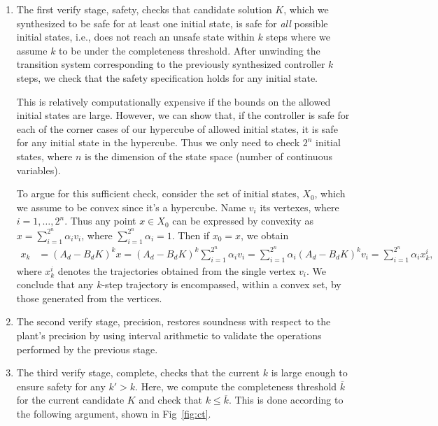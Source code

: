 \documentclass[runningheads,a4paper]{llncs}
\begin{document}
\begin{enumerate}
\item The first {\sc verify} stage, {\sc safety}, checks that candidate
solution $K$, which we synthesized to be safe for at least one initial state, is safe for \emph{all} possible initial states, i.e., does not reach an unsafe
state within $k$ steps where we assume $k$ to be under the completeness threshold. 
After unwinding the transition system corresponding to the previously synthesized controller
$k$ steps, we check that the safety specification holds for any initial state. 

This is relatively computationally expensive if the bounds on the
allowed initial states are large.  However, we can show that, if the
controller is safe for each of the corner cases of our hypercube of
allowed initial states, it is safe for any initial state in the
hypercube. Thus we only need to check $2^n$ initial states, where $n$
is the dimension of the state space (number of continuous variables). 

To argue for this sufficient check, 
consider the set of initial states, $X_0$, which we assume to be convex since it's a hypercube. 
Name $v_i$ its vertexes, where $i=1,\ldots, 2^n$.  
Thus any point $x \in X_0$ can be expressed by convexity as $x = \sum_{i=1}^{2^n} \alpha_i v_i$, 
where $\sum_{i=1}^{2^n} \alpha_i =1$. Then if $x_0=x$, we obtain 
\begin{align*}
x_k   &= (A_d - B_d K)^k x = (A_d - B_d K)^k \sum_{i=1}^{2^n} \alpha_i v_i 
      = \sum_{i=1}^{2^n} \alpha_i (A_d - B_d K)^k v_i = \sum_{i=1}^{2^n} \alpha_i x_k^i, 
 \end{align*}     
where $x_k^i$ denotes the trajectories obtained from the single vertex $v_i$. 
We conclude that any $k$-step trajectory is encompassed, within a convex set, by those generated from the vertices. 

\item The second {\sc verify} stage, {\sc precision}, 
 restores soundness with respect to the plant's precision
by using interval arithmetic \cite{moore1966interval} to validate the 
operations performed by the previous stage. 

\item The third {\sc verify} stage, {\sc complete}, checks that the
current $k$ is large enough to ensure safety for any $k'{>}k$.  Here, we compute the
completeness threshold $\overline{k}$ for the current candidate $K$
and check that $k{\leq}\overline{k}$. This is done according to the following argument, 
shown in Fig~\ref{fig:ct}.  


\end{enumerate}
\end{document}
